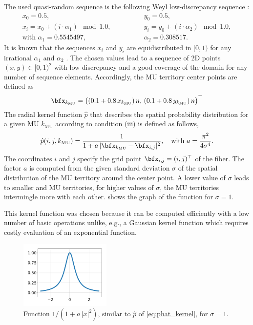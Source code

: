 The used quasi-random sequence is the following Weyl low-discrepancy sequence \cite{Weyl1916}:
\begin{equation}\label{eq:weyl}
  \begin{array}{lll}
    x_0 = 0.5, \qquad &y_0 = 0.5,\\[4mm]
    x_{i} = x_0+(i\cdot \alpha_1) \mod \num{1.0}, \qquad\qquad 
    &y_{i} = y_0+(i\cdot \alpha_2) \mod \num{1.0},\\[4mm]
    \text{with }\alpha_1 = \num{0.5545497}, \qquad &\alpha_2 = \num{0.308517}.
  \end{array}
\end{equation}
It is known that the sequences $x_i$ and $y_i$ are equidistributed in $[0,1)$ for any irrational $\alpha_1$ and $\alpha_2$ \cite{Weyl1916}. The chosen values lead to a sequence of 2D points $(x,y)\in $$[0,1)^2$ with low discrepancy and a good coverage of the domain for any number of sequence elements. Accordingly, the MU territory center points are defined as 
%
\begin{align*}
  \bfx_{k_\text{MU}} = \big((0.1 + 0.8\,x_{k_\text{MU}})\,n,\, (0.1 + 0.8\,y_{k_\text{MU}})\,n\big)^\top
\end{align*}
%
The radial kernel function $\hat{p}$ that describes the spatial probability distribution for a given MU $k_\text{MU}$ according to condition (iii) is defined as follows,
\begin{align}\label{eq:phat_kernel}
  \hat{p}(i,j,k_\text{MU}) = \dfrac{1}{1 + a\,\vert\bfx_{k_\text{MU}} - \bfx_{i,j}\vert^2}, \quad \text{with }a = \dfrac{\pi^2}{4\sigma^4}.
\end{align}
The coordinates $i$ and $j$ specify the grid point $\bfx_{i,j} = (i,j)^\top$ of the fiber. The factor $a$ is computed from the given standard deviation $\sigma$ of the spatial distribution of the MU territory around the center point. A lower value of $\sigma$ leads to smaller and  MU territories, for higher values of $\sigma$, the MU territories intermingle more with each other.
 shows the graph of the function for $\sigma=1$. 

This kernel function was chosen because it can be computed efficiently with a low number of basic operations unlike, e.g., a Gaussian kernel function which requires costly evaluation of an exponential function.

\begin{figure}%
  \centering%
  \includegraphics[width=0.4\textwidth]{images/motor_unit_assignment/phat.pdf}%
  \caption{Function $1/(1+a\,|x|^2)$, similar to $\hat{p}$ of \cref{eq:phat_kernel}, for $\sigma=1$.}%
  \label{fig:mu_phat}%
\end{figure}


